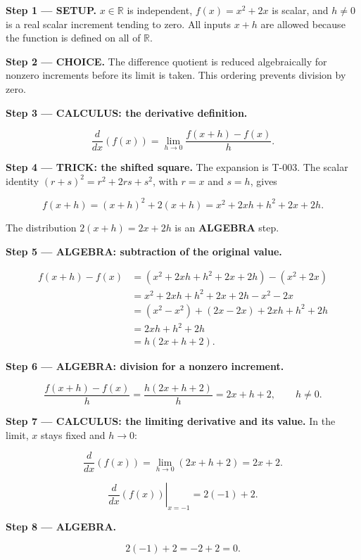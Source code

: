 \documentclass[11pt,oneside,openany]{book}
\begin{document}
\textbf{Step 1 --- SETUP.} \(x\in\mathbb R\) is independent, \(f(x)=x^2+2x\) is scalar,
and \(h\ne0\) is a real scalar increment tending to zero. All inputs \(x+h\) are
allowed because the function is defined on all of \(\mathbb R\).

\begin{ChoiceStep}
\textbf{Step 2 --- CHOICE.} The difference quotient is reduced algebraically for nonzero increments
before its limit is taken. This ordering prevents division by zero.

\end{ChoiceStep}
\textbf{Step 3 --- CALCULUS: the derivative definition.}

\[
\frac{d}{dx}\left(f(x)\right)
=\lim_{h\to0}\frac{f(x+h)-f(x)}{h}.
\]

\begingroup\color{TrickPurple}
\textbf{Step 4 --- TRICK: the shifted square.} The expansion is
T-003. The scalar identity
\((r+s)^2=r^2+2rs+s^2\), with \(r=x\) and \(s=h\), gives

\[
f(x+h)=(x+h)^2+2(x+h)=x^2+2xh+h^2+2x+2h.
\]

The distribution \(2(x+h)=2x+2h\) is an \textbf{ALGEBRA} step.

\endgroup
\begingroup\color{AlgebraBlue}
\textbf{Step 5 --- ALGEBRA: subtraction of the original value.}

\[
\begin{aligned}
f(x+h)-f(x)
&=(x^2+2xh+h^2+2x+2h)-(x^2+2x)\\
&=x^2+2xh+h^2+2x+2h-x^2-2x\\
&=(x^2-x^2)+(2x-2x)+2xh+h^2+2h\\
&=2xh+h^2+2h\\
&=h(2x+h+2).
\end{aligned}
\]

\endgroup
\begingroup\color{AlgebraBlue}
\textbf{Step 6 --- ALGEBRA: division for a nonzero increment.}

\[
\frac{f(x+h)-f(x)}{h}
=\frac{h(2x+h+2)}{h}
=2x+h+2,\qquad h\ne0.
\]

\endgroup
\textbf{Step 7 --- CALCULUS: the limiting derivative and its value.} In the
limit, \(x\) stays fixed and \(h\to0\):

\[
\frac{d}{dx}\left(f(x)\right)=\lim_{h\to0}(2x+h+2)=2x+2.
\]

\[
\left.\frac{d}{dx}\left(f(x)\right)\right|_{x=-1}=2(-1)+2.
\]

\begingroup\color{AlgebraBlue}
\textbf{Step 8 --- ALGEBRA.}

\[
2(-1)+2=-2+2=0.
\]
\end{document}

